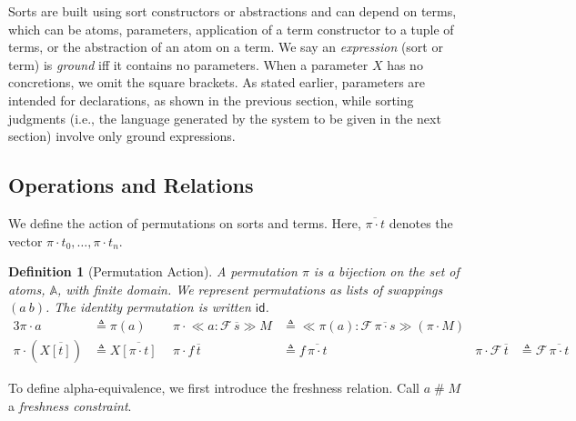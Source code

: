 \documentclass[copyright,creativecommons]{eptcs}
\newtheorem{definition}{Definition}
\newcounter{s}
\newcommand{\absterm}[2]{\ensuremath{\ll\!\!#1\!\!\gg #2}}
\newcommand{\concr}[2]{#1[#2]}
\newcommand{\vect}[1]{\ensuremath{\overline{#1}}}
\newcommand{\sconstr}[2]{\ensuremath{#1\,#2}}
\newcommand {\deffont}  [1] {\emph{#1}}
\newcommand {\id}       [0] {\mathsf{id}}
\newcommand {\act}      [0] {\cdot}
\newcommand {\prmAct}   [2] {#1 \act #2}
\newcommand{\varTrmD} [3] {\ensuremath{#3}} %
\newcommand {\susp}    [2] {\ifthenelse{\isempty{#1}}
                                       {\ifthenelse{\isempty{#2}}{}{#2}}
                                       {\ifthenelse{\isempty{#2}}{#1}{#1  | #2}}}
\newcommand {\prmCat}   [2] {#1 \mathrel{\circ} #2}
\newcommand {\hsh}      [0] {\#}
\newcommand {\frsh}    [0] {\mathrel{\hsh}}
\begin{document}
Sorts are built using sort constructors or abstractions and can depend
on terms, which can be atoms, parameters, application of a term constructor to a
tuple of terms, or the abstraction of an atom on a term.
We say an \emph{expression} (sort or term) is \emph{ground} iff it contains no parameters. When a parameter $X$ has no concretions, we omit the square brackets. As stated earlier, parameters are intended for declarations, as shown in the previous section, while sorting judgments (i.e., the language generated by the system to be given in the next section) involve only ground expressions.


\subsection{Operations and Relations}
We define the action of permutations on sorts and terms. Here, $\vect{\prmAct{\pi}{t}}$ denotes 
the vector $\prmAct{\pi}{t_0},\ldots,\prmAct{\pi}{t_n}$.

\begin{definition}[Permutation Action]
  \label{dependent:permutation_action}
  A \emph{permutation} $\pi$ is a bijection on the set of atoms, $\mathbb{A}$, with finite domain.
We represent permutations as lists of swappings  $(a\ b)$. The identity permutation is written $\id$.
  \begin{alignat*}{3}
\prmAct{\pi}{a} & \triangleq \pi(a)
&
\prmAct{\pi}{\absterm{a:\sconstr{\mathcal{F}}{\vect{s}}}{M}} & \triangleq \absterm{\pi(a):\sconstr{\mathcal{F}}{\vect{\pi\act s}}}{(\prmAct{\pi}{M})} 
\\
\prmAct{\pi}{(\varTrmD{\vartheta}{\pi'}{X} \vect{\concr{}{t
    }})} & \triangleq \varTrmD{\prmAct{\pi}{\vartheta}}{(\prmCat{\pi}{\pi'})}{X}\vect{\concr{}{\prmAct{\pi}{t}
}} \ \ &
\prmAct{\pi}{\sconstr{f}{\vect{t}} } & \triangleq \sconstr{f}{\vect{\prmAct{\pi}{t}}}
&
\prmAct{\pi}{\sconstr{\mathcal{F}}{\vect{t}}} & \triangleq \sconstr{\mathcal{F}}{\vect{\pi\act t}}
\end{alignat*}
\end{definition}

\noindent
To define alpha-equivalence, we first introduce the freshness relation. Call $a \frsh M$ a \deffont{freshness constraint}.
\end{document}
